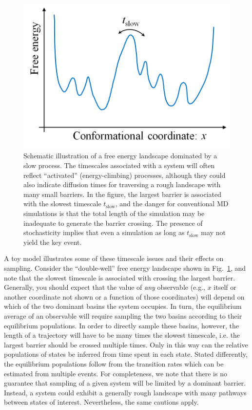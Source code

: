 


\begin{figure}
  \centering
  \includegraphics[width=0.9\linewidth]{figures/1d-landscape-tslow}
  \caption{
  \label{fig:landscape} 
  Schematic illustration of a free energy landscape dominated by a slow process.
  The timescales associated with a system will often reflect ``activated'' (energy-climbing) processes, although they could also indicate diffusion times for traversing a rough landscape with many small barriers.
  In the figure, the largest barrier is associated with the slowest timescale $t_{\mathrm{slow}}$, and the danger for conventional MD simulations is that the total length of the simulation may be inadequate to generate the barrier crossing.
  The presence of stochasticity implies that even a simulation as long as $t_{\mathrm{slow}}$ may not yield the key event.
  }
\end{figure}

A toy model illustrates some of these timescale issues and their effects on sampling.
Consider the ``double-well'' free energy landscape shown in Fig.\ \ref{fig:landscape}, and note that the slowest timescale is associated with crossing the largest barrier.  Generally, you should expect that the value of \emph{any} observable (e.g., $x$ itself or another coordinate not shown or a function of those coordinates) will depend on which of the two dominant basins the system occupies.  In turn, the equilibrium average of an observable will require sampling the two basins according to their equilibrium populations.  In order to directly sample these basins, however, the length of a trajectory will have to be many times the slowest timescale, i.e. the largest barrier should be crossed multiple times.  Only in this way can the relative populations of states be inferred from time spent in each state.  Stated differently, the equilibrium populations follow from the transition rates \cite{Zuckerman2011,Chou11,Kolmogoroff1936} which can be estimated from multiple events.  For completeness, we note that there is no guarantee that sampling of a given system will be limited by a dominant barrier.  Instead, a system could exhibit a generally rough landscape with many pathways between states of interest.
Nevertheless, the same cautions apply.

